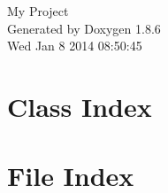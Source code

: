 \documentclass[twoside]{book}
\newcommand{\clearemptydoublepage}{%
  \newpage{\pagestyle{empty}\cleardoublepage}%
}
\begin{document}
\hypersetup{pageanchor=false}
\begin{titlepage}
\vspace*{7cm}
\begin{center}%
{\Large My Project }\\
\vspace*{1cm}
{\large Generated by Doxygen 1.8.6}\\
\vspace*{0.5cm}
{\small Wed Jan 8 2014 08:50:45}\\
\end{center}
\end{titlepage}
\clearemptydoublepage
\tableofcontents
\clearemptydoublepage
{}
\hypersetup{pageanchor=true}

\chapter{Class Index}

\chapter{File Index}

\end{document}
